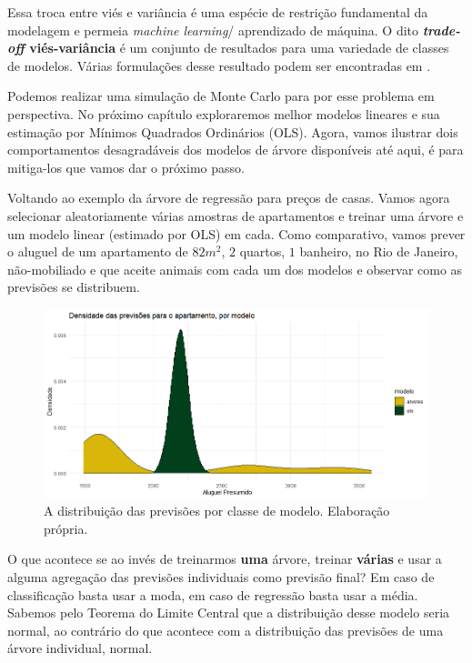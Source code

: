 Essa troca entre viés e variância é uma espécie de restrição fundamental da modelagem e permeia \textit{machine learning}/ aprendizado de máquina. O dito \textbf{\textit{trade-off} viés-variância} é um conjunto de resultados para uma variedade de classes de modelos. Várias formulações desse resultado podem ser encontradas em .

Podemos realizar uma simulação de Monte Carlo para por esse problema em perspectiva. No próximo capítulo exploraremos melhor modelos lineares e sua estimação por Mínimos Quadrados Ordinários (OLS). Agora, vamos ilustrar dois comportamentos desagradáveis dos modelos de árvore disponíveis até aqui, é para mitiga-los que vamos dar o próximo passo. 

\begin{exemplo}
Voltando ao exemplo da árvore de regressão para preços de casas. Vamos agora selecionar aleatoriamente várias amostras de apartamentos e treinar uma árvore e um modelo linear (estimado por OLS) em cada. Como comparativo, vamos prever o aluguel de um apartamento de $82m^2$, $2$ quartos, $1$ banheiro, no Rio de Janeiro, não-mobiliado e que aceite animais com cada um dos modelos e observar como as previsões se distribuem. 



\begin{figure}[H]
    \centering
    \includegraphics[scale = .60]{imagens/exemplo_var_arvores.png}
    \caption{A distribuição das previsões por classe de modelo. Elaboração própria.}
    \label{fig:arvore_var_ols}
\end{figure}

\end{exemplo}

O que acontece se ao invés de treinarmos \textbf{uma} árvore, treinar \textbf{várias} e usar a alguma agregação das previsões individuais como previsão final? Em caso de classificação basta usar a moda, em caso de regressão basta usar a média. Sabemos pelo Teorema do Limite Central que a distribuição desse modelo seria normal, ao contrário do que acontece com a distribuição das previsões de uma árvore individual, normal. 

